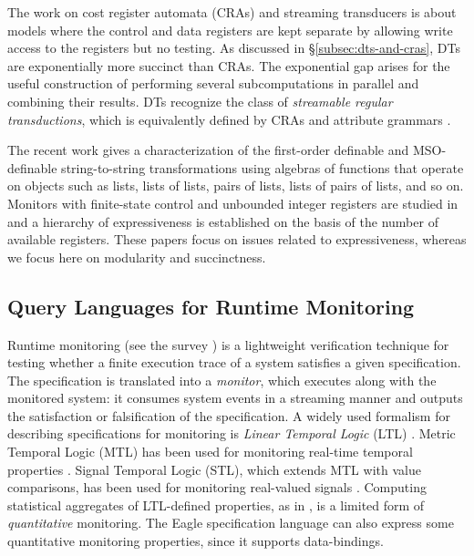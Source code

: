 The work on cost register automata (CRAs) \cite{AdADRY2013CRA, AR2013ARF} and streaming transducers \cite{AC2010SST, AC2011STA, AdA2012STT} is about models where the control and data registers are kept separate by allowing write access to the registers but no testing. As discussed in \S\ref{subsec:dts-and-cras}, DTs are exponentially more succinct than CRAs. The exponential gap arises for the useful construction of performing several subcomputations in parallel and combining their results. DTs recognize the class of \emph{streamable regular transductions}, which
is equivalently defined by CRAs and attribute grammars \cite{arXiv2018}.

The recent work \cite{BDK2018} gives a characterization of the first-order definable and MSO-definable string-to-string transformations using algebras of functions that operate on objects such as lists, lists of lists, pairs of lists, lists of pairs of lists, and so on. Monitors with finite-state control and unbounded integer registers are studied in \cite{FHS2018} and a hierarchy of expressiveness is established on the basis of the number of available registers. These papers focus on issues related to expressiveness, whereas we focus here on modularity and succinctness.

\subsection{Query Languages for Runtime Monitoring}

Runtime monitoring (see the survey \cite{LS2009RV}) is a lightweight verification technique for testing whether a finite execution trace of a system satisfies a given specification. The specification is translated into a \emph{monitor}, which executes along with the monitored system: it consumes system events in a streaming manner and outputs the satisfaction or falsification of the specification. A widely used formalism for describing specifications for monitoring is \emph{Linear Temporal Logic} (LTL) \cite{havelund2004efficient}. Metric Temporal Logic (MTL) has been used for monitoring real-time temporal properties \cite{TR2005MTL}. Signal Temporal Logic (STL), which extends MTL with value comparisons, has been used for monitoring real-valued signals \cite{DDGJJS2017}.
Computing statistical aggregates of LTL-defined properties, as in \cite{finkbeiner2002collecting}, is a limited form of \emph{quantitative} monitoring.
The Eagle specification language \cite{barringer2004rule} can also express some quantitative monitoring properties, since it supports data-bindings.

